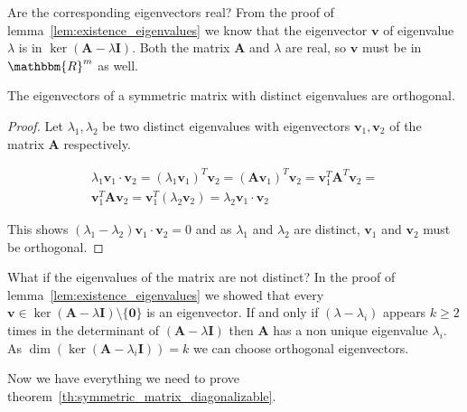 Are the corresponding eigenvectors real? From the proof of lemma~\ref{lem:existence_eigenvalues} we know that the eigenvector $\mathbf{v}$ of eigenvalue $\lambda$ is in $\ker(\mathbf{A} - \lambda\mathbf{I})$. Both the matrix $\mathbf{A}$ and $\lambda$ are real, so $\mathbf{v}$ must be in $\mathbbm{R}^m$ as well.

\begin{lemma}
	\label{lem:symmetric_matrix_eigenvector_orthogonal}
	The eigenvectors of a symmetric matrix with distinct eigenvalues are orthogonal.
\end{lemma}

\begin{proof}
	Let $\lambda_1, \lambda_2$ be two distinct eigenvalues with eigenvectors $\mathbf{v}_1, \mathbf{v}_2$ of the matrix $\mathbf{A}$ respectively.
	
	\begin{align*}
		\lambda_1 \mathbf{v}_1 \cdot \mathbf{v}_2 = (\lambda_1\mathbf{v}_1)^T \mathbf{v}_2 = (\mathbf{Av}_1)^T \mathbf{v}_2 = \mathbf{v}_1^T \mathbf{A}^T \mathbf{v}_2 =\\
		\mathbf{v}_1^T \mathbf{A} \mathbf{v}_2 = \mathbf{v}_1^T (\lambda_2 \mathbf{v}_2) = \lambda_2 \mathbf{v}_1 \cdot \mathbf{v}_2
	\end{align*}
	
	This shows $(\lambda_1 - \lambda_2) \mathbf{v}_1 \cdot \mathbf{v}_2 = 0$ and as $\lambda_1$ and $\lambda_2$ are distinct, $\mathbf{v}_1$ and $\mathbf{v}_2$ must be orthogonal.
\end{proof}

What if the eigenvalues of the matrix are not distinct? In the proof of lemma~\ref{lem:existence_eigenvalues} we showed that every $\mathbf{v} \in \ker(\mathbf{A} - \lambda\mathbf{I}) \setminus \{\mathbf{0}\}$ is an eigenvector. If and only if $(\lambda - \lambda_i)$ appears $k \geq 2$ times in the determinant of $(\mathbf{A} - \lambda\mathbf{I})$ then $\mathbf{A}$ has a non unique eigenvalue $\lambda_i$. As ${\dim(\ker(\mathbf{A} - \lambda_i\mathbf{I})) = k}$ we can choose orthogonal eigenvectors. 


Now we have everything we need to prove theorem~\ref{th:symmetric_matrix_diagonalizable}. 


